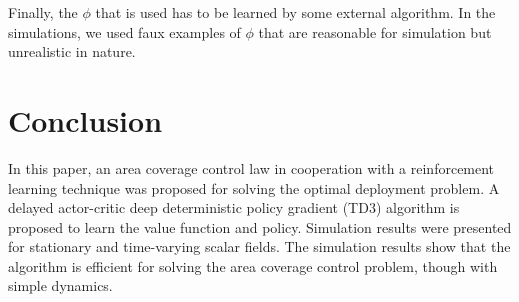\documentclass[10pt,conference]{IEEEtran}
\begin{document}
Finally, the $\phi$ that is used has to be learned by some external algorithm. In the simulations, we used faux examples of $\phi$ that are reasonable for simulation but unrealistic in nature. 
\section{Conclusion}
	In this paper, an area coverage control law in cooperation with a reinforcement learning technique was proposed for solving the optimal deployment problem. A delayed actor-critic deep deterministic policy gradient (TD3) algorithm is proposed to learn the value function and policy. Simulation results were presented for stationary and time-varying scalar fields. The simulation results show that the algorithm is efficient for solving the area coverage control problem, though with simple dynamics. 
\nocite{*}


	
\end{document}
